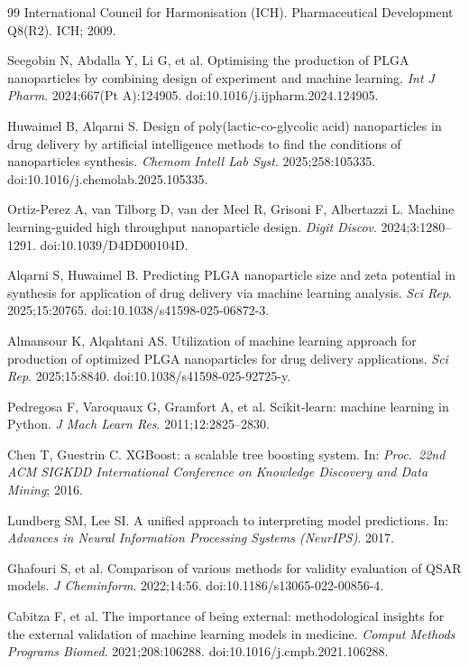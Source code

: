 \documentclass[10pt]{NSP1}
\begin{document}
\begin{thebibliography}{99}
 International Council for Harmonisation (ICH). Pharmaceutical Development Q8(R2).
ICH; 2009.

 Seegobin N, Abdalla Y, Li G, et al. Optimising the production of PLGA
nanoparticles by combining design of experiment and machine learning. \textit{Int J Pharm}.
2024;667(Pt A):124905. doi:10.1016/j.ijpharm.2024.124905.

 Huwaimel B, Alqarni S. Design of poly(lactic-co-glycolic acid) nanoparticles in
drug delivery by artificial intelligence methods to find the conditions of nanoparticles synthesis.
\textit{Chemom Intell Lab Syst}. 2025;258:105335. doi:10.1016/j.chemolab.2025.105335.

 Ortiz-Perez A, van Tilborg D, van der Meel R, Grisoni F, Albertazzi L. Machine
learning-guided high throughput nanoparticle design. \textit{Digit Discov}. 2024;3:1280--1291.
doi:10.1039/D4DD00104D.

 Alqarni S, Huwaimel B. Predicting PLGA nanoparticle size and zeta potential in
synthesis for application of drug delivery via machine learning analysis. \textit{Sci Rep}.
2025;15:20765. doi:10.1038/s41598-025-06872-3.

 Almansour K, Alqahtani AS. Utilization of machine learning approach for production
of optimized PLGA nanoparticles for drug delivery applications. \textit{Sci Rep}. 2025;15:8840.
doi:10.1038/s41598-025-92725-y.

 Pedregosa F, Varoquaux G, Gramfort A, et al. Scikit-learn: machine learning in
Python. \textit{J Mach Learn Res}. 2011;12:2825--2830.

 Chen T, Guestrin C. XGBoost: a scalable tree boosting system. In: \textit{Proc.\
22nd ACM SIGKDD International Conference on Knowledge Discovery and Data Mining}; 2016.

 Lundberg SM, Lee SI. A unified approach to interpreting model predictions. In:
\textit{Advances in Neural Information Processing Systems (NeurIPS)}. 2017.

 Ghafouri S, et al. Comparison of various methods for validity evaluation of QSAR
models. \textit{J Cheminform}. 2022;14:56. doi:10.1186/s13065-022-00856-4.

 Cabitza F, et al. The importance of being external: methodological insights for
the external validation of machine learning models in medicine. \textit{Comput Methods Programs
Biomed}. 2021;208:106288. doi:10.1016/j.cmpb.2021.106288.


\end{thebibliography}
\end{document}
